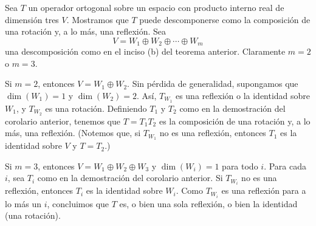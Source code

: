 \begin{ejemplo}
    Sea $T$ un operador ortogonal sobre un espacio con producto interno real de dimensión tres $V$. Mostramos que $T$ puede descomponerse como la composición de una rotación y, a lo más, una reflexión. Sea
    \begin{equation*}
        V=W_1\oplus W_2\oplus\cdots\oplus W_m
    \end{equation*}
    una descomposición como en el inciso (b) del teorema anterior. Claramente $m=2$ o $m=3$.

    Si $m=2$, entonces $V=W_1\oplus W_2$. Sin pérdida de generalidad, supongamos que $\dim(W_1)=1$ y $\dim(W_2)=2$. Así, $T_{W_1}$ es una reflexión o la identidad sobre $W_1$, y $T_{W_2}$ es una rotación. Definiendo $T_1$ y $T_2$ como en la demostración del corolario anterior, tenemos que $T=T_1T_2$ es la composición de una rotación y, a lo más, una reflexión. (Notemos que, si $T_{W_1}$ no es una reflexión, entonces $T_1$ es la identidad sobre $V$ y $T=T_2$.)

    Si $m=3$, entonces $V=W_1\oplus W_2\oplus W_3$ y $\dim(W_i)=1$ para todo $i$. Para cada $i$, sea $T_i$ como en la demostración del corolario anterior. Si $T_{W_i}$ no es una reflexión, entonces $T_i$ es la identidad sobre $W_i$. Como $T_{W_i}$ es una reflexión para a lo más un $i$, concluimos que $T$ es, o bien una sola reflexión, o bien la identidad (una rotación).
\end{ejemplo}